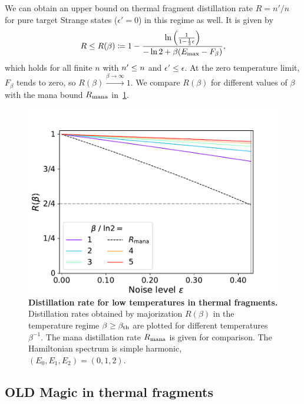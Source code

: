 \documentclass[pra,
aps,
twocolumn,
superscriptaddress,
groupedaddress,
nofootinbib,
reprint
]{revtex4-1}
\begin{document}
We can obtain an upper bound on thermal fragment distillation rate $R=n'/n$ for pure target Strange states ($\epsilon' = 0$) in this regime as well. 
It is given by
\begin{equation}
	R \leq R(\beta) \coloneqq 1 - \frac{\ln{\left(\frac{1}{1-\frac{1}{3}\epsilon} \right)}}{-\ln{2} + \beta (E_{\rm{max}} - F_\beta)},
\end{equation}
which holds for all finite $n$ with $\tt \leq n$ and $\epsilon' \leq \epsilon$.
At the zero temperature limit, $F_\beta$ tends to zero, so $R(\beta) \xrightarrow{\beta \rightarrow \infty} 1$.
We compare $R(\beta)$ for different values of $\beta$ with the mana bound $R_{\rm{mana}}$ in~\cref{fig:distill_bounds_lowtemp}.
\begin{figure}[h]
    \centering
    \includegraphics[scale=0.5]{figs/distill_bounds_lowtemp.pdf}
    \caption{\textbf{Distillation rate for low temperatures in thermal fragments.} Distillation rates obtained by majorization $R(\beta)$ in the temperature regime $\beta \geq \beta_{\rm{th}}$ are plotted for different temperatures $\beta^{-1}$.
    The mana distillation rate $R_{\rm{mana}}$ is given for comparison.
    The Hamiltonian spectrum is simple harmonic, $(E_0, E_1, E_2) = (0,1,2)$.
    }
    \label{fig:distill_bounds_lowtemp}
\end{figure}




\null\newpage
\null\newpage


\subsection{OLD Magic in thermal fragments}
\end{document}
